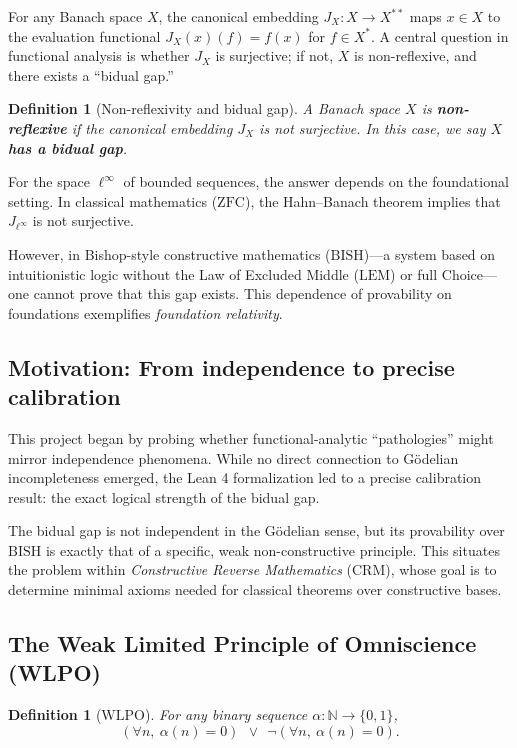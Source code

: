 \documentclass[11pt]{article}
\newtheorem{definition}[theorem]{Definition}
\newenvironment{defi}{\begin{definition}}{\end{definition}}
\newcommand{\N}{\mathbb{N}}
\newcommand{\linf}{\ell^\infty}
\newcommand{\WLPO}{\mathrm{WLPO}}
\newcommand{\BISH}{\mathrm{BISH}}
\newcommand{\CRM}{\mathrm{CRM}}
\newcommand{\LEM}{\mathrm{LEM}}
\newcommand{\ZFC}{\mathrm{ZFC}}
\begin{document}
For any Banach space $X$, the canonical embedding $J_X:X\to X^{**}$ maps $x\in X$ to the evaluation functional $J_X(x)(f)=f(x)$ for $f\in X^*$. A central question in functional analysis is whether $J_X$ is surjective; if not, $X$ is non-reflexive, and there exists a ``bidual gap.''

\begin{definition}[Non-reflexivity and bidual gap]
A Banach space $X$ is \textbf{non-reflexive} if the canonical embedding $J_X$ is not surjective. In this case, we say $X$ \textbf{has a bidual gap}.
\end{definition}

For the space $\linf$ of bounded sequences, the answer depends on the foundational setting. In classical mathematics ($\ZFC$), the Hahn--Banach theorem implies that $J_{\linf}$ is not surjective.

However, in Bishop-style constructive mathematics ($\BISH$)---a system based on intuitionistic logic without the Law of Excluded Middle ($\LEM$) or full Choice---one cannot prove that this gap exists. This dependence of provability on foundations exemplifies \emph{foundation relativity}.

\subsection{Motivation: From independence to precise calibration}

This project began by probing whether functional-analytic ``pathologies'' might mirror independence phenomena. While no direct connection to G\"odelian incompleteness emerged, the Lean 4 formalization led to a precise calibration result: the exact logical strength of the bidual gap.

The bidual gap is not independent in the G\"odelian sense, but its provability over $\BISH$ is exactly that of a specific, weak non-constructive principle. This situates the problem within \emph{Constructive Reverse Mathematics} ($\CRM$), whose goal is to determine minimal axioms needed for classical theorems over constructive bases.

\subsection{The Weak Limited Principle of Omniscience (WLPO)}

\begin{defi}[$\WLPO$]
For any binary sequence $\alpha:\N\to\{0,1\}$,
\[
(\forall n,\ \alpha(n)=0)\ \ \vee\ \ \neg(\forall n,\ \alpha(n)=0).
\]
\end{defi}
\end{document}
